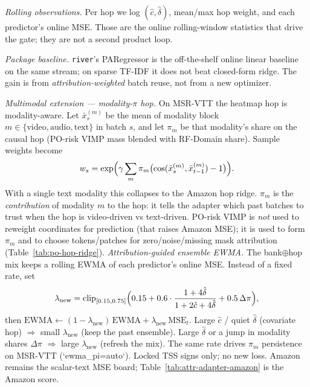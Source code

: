 \emph{Rolling observations.}
Per hop we log $(\hat c,\hat\delta)$, mean/max hop weight, and each
predictor's online MSE.
Those are the online rolling-window statistics that drive the gate; they
are not a second product loop.

\emph{Package baseline.}
\texttt{river}'s PARegressor is the off-the-shelf online linear baseline on
the same stream; on sparse TF-IDF it does not beat closed-form ridge.
The gain is from \emph{attribution-weighted} batch reuse, not from a new
optimizer.

\emph{Multimodal extension --- modality-$\pi$ hop.}
On MSR-VTT the heatmap hop is modality-aware. Let $\bar x_s^{(m)}$ be the
mean of modality block $m\in\{\mathrm{video},\mathrm{audio},\mathrm{text}\}$
in batch $s$, and let $\pi_m$ be that modality's share on the causal hop
(PO-risk VIMP mass blended with RF-Domain share). Sample weights become
\begin{equation}
  w_s
  =
  \exp\Bigl(
    \gamma\sum_m \pi_m\bigl(\cos(\bar x_s^{(m)},\bar x_{t-1}^{(m)})-1\bigr)
  \Bigr).
\end{equation}
With a single text modality this collapses to the Amazon hop ridge.
$\pi_m$ is the \emph{contribution} of modality $m$ to the hop: it tells the
adapter which past batches to trust when the hop is video-driven vs
text-driven. PO-risk VIMP is \emph{not} used to reweight coordinates for
prediction (that raises Amazon MSE); it is used to form $\pi_m$ and to
choose tokens/patches for zero/noise/missing mask attribution
(Table~\ref{tab:po-hop-ridge}).
\emph{Attribution-guided ensemble EWMA.}
The bank$\oplus$hop mix keeps a rolling EWMA of each predictor's online MSE.
Instead of a fixed rate, set
\[
  \lambda_{\mathrm{new}}
  =
  \mathrm{clip}_{[0.15,0.75]}
  \Bigl(
    0.15 + 0.6\cdot
    \frac{1+4\hat\delta}{1+2\hat c+4\hat\delta}
    + 0.5\,\Delta\pi
  \Bigr),
\]
then $\mathrm{EWMA}\leftarrow (1-\lambda_{\mathrm{new}})\,\mathrm{EWMA}+\lambda_{\mathrm{new}}\,\mathrm{MSE}_t$.
Large $\hat c$ / quiet $\hat\delta$ (covariate hop) $\Rightarrow$ small $\lambda_{\mathrm{new}}$
(keep the past ensemble). Large $\hat\delta$ or a jump in modality shares
$\Delta\pi$ $\Rightarrow$ large $\lambda_{\mathrm{new}}$ (refresh the mix).
The same rate drives $\pi_m$ persistence on MSR-VTT (`ewma_pi=auto`).
Locked TSS signs only; no new loss.
Amazon remains the scalar-text MSE board;
Table~\ref{tab:attr-adapter-amazon} is the Amazon score.
